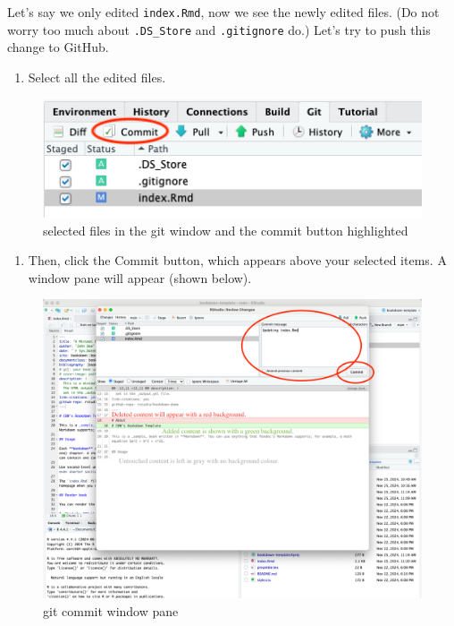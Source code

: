 \documentclass[
]{book}
\providecommand{\tightlist}{%
  \setlength{\itemsep}{0pt}\setlength{\parskip}{0pt}}
\theoremstyle{definition}
\theoremstyle{definition}
\theoremstyle{definition}
\theoremstyle{definition}
\theoremstyle{remark}
\begin{document}
Let's say we only edited \texttt{index.Rmd}, now we see the newly edited files. (Do not worry too much about \texttt{.DS\_Store} and \texttt{.gitignore} do.) Let's try to push this change to GitHub.

\begin{enumerate}
\def\labelenumi{\arabic{enumi}.}
\setcounter{enumi}{12}
\tightlist
\item
  Select all the edited files.
\end{enumerate}

\begin{figure}
\centering
\includegraphics{img/git-instruct/git-window-selected-items.png}
\caption{selected files in the git window and the commit button highlighted}
\end{figure}

\begin{enumerate}
\def\labelenumi{\arabic{enumi}.}
\setcounter{enumi}{13}
\tightlist
\item
  Then, click the Commit button, which appears above your selected items. A window pane will appear (shown below).
\end{enumerate}

\begin{figure}
\centering
\includegraphics{img/git-instruct/git-commit-window.png}
\caption{git commit window pane}
\end{figure}
\end{document}

